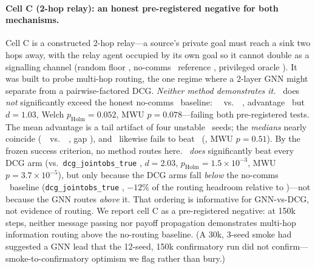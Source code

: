 \paragraph{Cell C (2-hop relay): an honest pre-registered negative for both
mechanisms.} Cell C is a constructed 2-hop relay---a source's private goal must
reach a sink two hops away, with the relay agent occupied by its own goal so it
cannot double as a signalling channel (random floor \CBCfloor, no-comms
\mlpqmix\ reference \CBCmlp, privileged oracle \CBCoracle). It was built to
probe multi-hop routing, the one regime where a 2-layer GNN might separate from
a pairwise-factored DCG. \emph{Neither method demonstrates it.} \gtrue\ does
\emph{not} significantly exceed the honest no-comms \mlpqmix\ baseline: \CBCgnn\
\CBCgnnCI\ vs.\ \CBCmlp\ \CBCmlpCI, advantage \CBCgnnMlpGap\ but $d{=}1.03$,
Welch $p_{\text{Holm}}{=}0.052$, MWU $p{=}0.078$---failing both pre-registered
tests. The mean advantage is a tail artifact of four unstable \mlpqmix\ seeds;
the \emph{medians} nearly coincide (\gtrue\ \CBCgnnMed\ vs.\ \mlpqmix\
\CBCmlpMed, gap \CBCmedGap), and \gatqmix\ likewise fails to beat \mlpqmix\
(\CBCgatMlpGap, MWU $p{=}0.51$). By the frozen success criterion, no method
routes here. \gtrue\ \emph{does} significantly beat every DCG arm (vs.\
\texttt{dcg\_jointobs\_true} \CBCgnnDcgGap, $d{=}2.03$,
$p_{\text{Holm}}{=}1.5{\times}10^{-3}$, MWU $p{=}3.7{\times}10^{-5}$), but only
because the DCG arms fall \emph{below} the no-comms \mlpqmix\ baseline
(\texttt{dcg\_jointobs\_true} \CBCdcgtrue, ${-}12\%$ of the routing headroom
relative to \mlpqmix)---not because the GNN routes \emph{above} it. That
ordering is informative for GNN-vs-DCG, not evidence of routing. We report cell
C as a pre-registered negative: at 150k steps, neither message passing nor
payoff propagation demonstrates multi-hop information routing above the
no-routing baseline. (A 30k, 3-seed smoke had suggested a GNN lead that the
12-seed, 150k confirmatory run did not confirm---smoke-to-confirmatory optimism
we flag rather than bury.)

